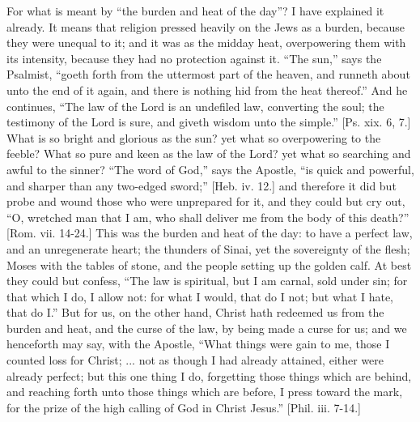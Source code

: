 For what is meant by ``the burden and heat of the day''? I
have explained it already. It means that religion pressed heavily on
the Jews as a burden, because they were unequal to it; and it was as
the midday heat, overpowering them with its intensity, because they
had no protection against it. ``The sun,'' says the Psalmist,
``goeth forth from the uttermost part of the heaven, and runneth
about unto the end of it again, and there is nothing hid from the heat
thereof.'' And he continues, ``The law of the Lord is an
undefiled law, converting the soul; the testimony of the Lord is sure,
and giveth wisdom unto the simple.'' [Ps. xix. 6, 7.] What is so
bright and glorious as the sun? yet what so overpowering to the
feeble? What so pure and keen as the law of the Lord? yet what so
searching and awful to the sinner? ``The word of God,'' says
the Apostle, ``is quick and powerful, and sharper than any
two-edged sword;'' [Heb. iv. 12.] and therefore it did but probe
and wound those who were unprepared for it, and they could but cry
out, ``O, wretched man that I am, who shall deliver me from the
body of this death?'' [Rom. vii. 14-24.] This was the burden and
heat of the day: to have a perfect law, and an unregenerate heart; the
thunders of Sinai, yet the sovereignty of the flesh; Moses with the
tables of stone, and the people setting up the golden calf. At best
they could but confess, ``The law is spiritual, but I am carnal,
sold under sin; for that which I do, I allow not: for what I would,
that do I not; but what I hate, that do I.'' But for us, on the
other hand, Christ hath redeemed us from the burden and heat, and the
curse of the law, by being made a curse for us; and we henceforth may
say, with the Apostle, ``What things were gain to me, those I
counted loss for Christ; ... not as though I had already attained,
either were already perfect; but this one thing I do, forgetting those
things which are behind, and reaching forth unto those things which
are before, I press toward the mark, for the prize of the high calling
of God in Christ Jesus.'' [Phil. iii. 7-14.]

